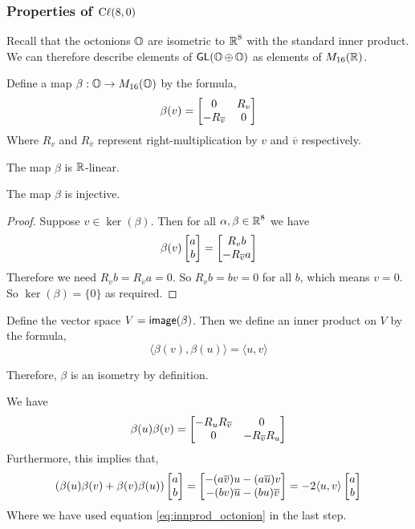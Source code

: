 \subsubsection{Properties of $\operatorname{C\ell}(8,0)$}
Recall that the octonions $\operatorname{\mathbb{O}}$ are isometric to $\operatorname{\mathbb{R}}^8$ with the standard inner product. We can therefore describe elements of $\operatorname{\textsf{GL}}(\operatorname{\mathbb{O}}\oplus \operatorname{\mathbb{O}})$ as elements of $M_{16}(\operatorname{\mathbb{R}})$.

\begin{defn}
    Define a map $\beta : \operatorname{\mathbb{O}} \to M_{16}(\operatorname{\mathbb{O}})$ by the formula,
    \[\beta(v) = \begin{bmatrix}0 & R_v\\-R_{\overline{v}}&0\end{bmatrix}\]
    Where $R_v$ and $R_{\overline{v}}$ represent right-multiplication by $v$ and $\overline{v}$ respectively.
\end{defn}
\begin{remark*}
    The map $\beta$ is $\operatorname{\mathbb{R}}$-linear.
\end{remark*}
\begin{lemma}
    The map $\beta$ is injective.
\end{lemma}
\begin{proof}
    Suppose $v\in\ker(\beta)$. Then for all $\alpha,\beta\in \operatorname{\mathbb{R}}^8$ we have
    \[\beta(v)\begin{bmatrix}a\\b\end{bmatrix} =\begin{bmatrix}R_vb\\ -R_{\overline{v}}a\end{bmatrix}\]
    Therefore we need $R_vb=R_{\overline{v}}a=0$. So $R_v b = bv = 0$ for all $b$, which means $v=0$. So $\ker(\beta)=\{0\}$ as required.
\end{proof}
\begin{defn}
    Define the vector space $V = \operatorname{\textsf{image}}(\beta)$. Then we define an inner product on $V$ by the formula,
    \[\langle \beta(v),\beta(u)\rangle = \langle u,v\rangle\]
\end{defn}
\begin{remark*}
    Therefore, $\beta$ is an isometry by definition.
\end{remark*}
\begin{remark*}
    We have
    \[\beta(u)\beta(v)=\begin{bmatrix}-R_uR_{\overline{v}}&0\\0&-R_{\overline{v}}R_u\end{bmatrix}\]
    Furthermore, this implies that,
    \[(\beta(u)\beta(v) + \beta(v)\beta(u))\begin{bmatrix}a\\b\end{bmatrix} =\begin{bmatrix}-(a\overline{v})u-(a\overline{u})v\\-(bv)\overline{u}-(bu)\overline{v}\end{bmatrix} = -2\langle u,v\rangle \begin{bmatrix}a\\b\end{bmatrix} \]
    Where we have used equation \eqref{eq:innprod_octonion} in the last step.
\end{remark*}
